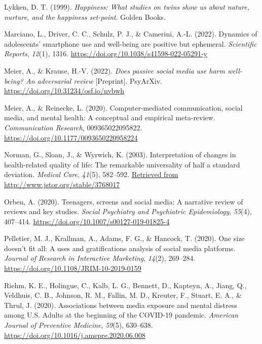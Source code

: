 \documentclass[
  man,mask,floatsintext]{apa7}
\newlength{\cslhangindent}
\newlength{\cslentryspacingunit} %
\newenvironment{CSLReferences}[2] %
 {%
  \setlength{\parindent}{0pt}
  \ifodd #1
  \let\oldpar\par
  \def\par{\hangindent=\cslhangindent\oldpar}
  \fi
  \setlength{\parskip}{#2\cslentryspacingunit}
 }%
 {}
\begin{document}
\begin{CSLReferences}{1}{0}
\leavevmode{}%
Lykken, D. T. (1999). \emph{Happiness: {What} studies on twins show us about nature, nurture, and the happiness set-point}. {Golden Books}.

\leavevmode{}%
Marciano, L., Driver, C. C., Schulz, P. J., \& Camerini, A.-L. (2022). Dynamics of adolescents' smartphone use and well-being are positive but ephemeral. \emph{Scientific Reports}, \emph{12}(1), 1316. \url{https://doi.org/10.1038/s41598-022-05291-y}

\leavevmode{}%
Meier, A., \& Krause, H.-V. (2022). \emph{Does passive social media use harm well-being? {An} adversarial review} {[}Preprint{]}. {PsyArXiv}. \url{https://doi.org/10.31234/osf.io/nvbwh}

\leavevmode{}%
Meier, A., \& Reinecke, L. (2020). Computer-mediated communication, social media, and mental health: {A} conceptual and empirical meta-review. \emph{Communication Research}, 009365022095822. \url{https://doi.org/10.1177/0093650220958224}

\leavevmode{}%
Norman, G., Sloan, J., \& Wyrwich, K. (2003). Interpretation of changes in health-related quality of life: {The} remarkable universality of half a standard deviation. \emph{Medical Care}, \emph{41}(5), 582--592. \href{Retrieved\%20from\%20http://www.jstor.org/stable/3768017}{Retrieved from http://www.jstor.org/stable/3768017}

\leavevmode{}%
Orben, A. (2020). Teenagers, screens and social media: A narrative review of reviews and key studies. \emph{Social Psychiatry and Psychiatric Epidemiology}, \emph{55}(4), 407--414. \url{https://doi.org/10.1007/s00127-019-01825-4}

\leavevmode{}%
Pelletier, M. J., Krallman, A., Adams, F. G., \& Hancock, T. (2020). One size doesn't fit all: A uses and gratifications analysis of social media platforms. \emph{Journal of Research in Interactive Marketing}, \emph{14}(2), 269--284. \url{https://doi.org/10.1108/JRIM-10-2019-0159}

\leavevmode{}%
Riehm, K. E., Holingue, C., Kalb, L. G., Bennett, D., Kapteyn, A., Jiang, Q., Veldhuis, C. B., Johnson, R. M., Fallin, M. D., Kreuter, F., Stuart, E. A., \& Thrul, J. (2020). Associations between media exposure and mental distress among {U}.{S}. Adults at the beginning of the {COVID-19} pandemic. \emph{American Journal of Preventive Medicine}, \emph{59}(5), 630--638. \url{https://doi.org/10.1016/j.amepre.2020.06.008}


\end{CSLReferences}
\end{document}
